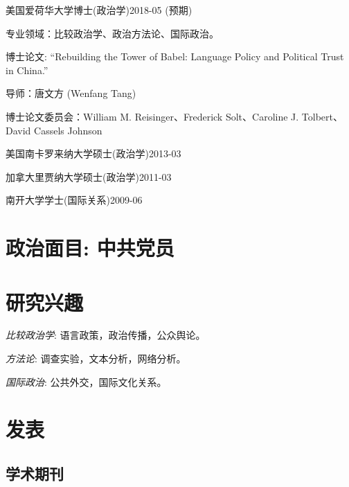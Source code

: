 \documentclass[10.5pt,]{article}
\providecommand{\tightlist}{%
	\setlength{\itemsep}{0pt}\setlength{\parskip}{0pt}}
\renewenvironment{itemize}{
	\begin{list}{}{
			\setlength{\leftmargin}{1.5em}
		}
	}{
	\end{list}
}
\begin{document}
\begin{itemize}
\tightlist
\item
  美国爱荷华大学博士(政治学)\hfill 2018-05 (预期)

  \begin{itemize}
  \tightlist
  \item
    \footnotesize 专业领域：比较政治学、政治方法论、国际政治。
  \item
    \footnotesize 博士论文: ``Rebuilding the Tower of Babel: Language
    Policy and Political Trust in China.''

    \begin{itemize}
    \tightlist
    \item
      导师：唐文方 (Wenfang Tang)
    \item
      博士论文委员会：William M. Reisinger、Frederick Solt、Caroline J.
      Tolbert、David Cassels Johnson
    \end{itemize}
  \end{itemize}
\item
  美国南卡罗来纳大学硕士(政治学)\hfill 2013-03
\item
  加拿大里贾纳大学硕士(政治学)\hfill 2011-03
\item
  南开大学学士(国际关系)\hfill 2009-06
\end{itemize}

\section{政治面目: 中共党员}\label{-}

\section{研究兴趣}

\begin{itemize}
\tightlist
\item
  \emph{比较政治学}: 语言政策，政治传播，公众舆论。
\item
  \emph{方法论}: 调查实验，文本分析，网络分析。
\item
  \emph{国际政治}: 公共外交，国际文化关系。
\end{itemize}

\section{发表}

\subsection{学术期刊}
\end{document}
